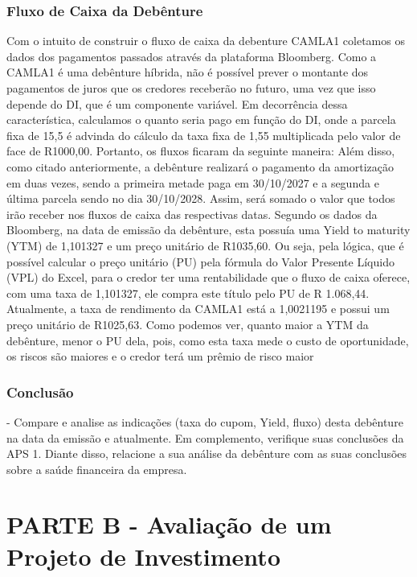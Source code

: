 \documentclass[11pt]{article}
\begin{document}
\subsubsection{\textbf{Fluxo de Caixa da Debênture }}
Com o intuito de construir o fluxo de caixa da debenture CAMLA1 coletamos os dados dos pagamentos passados através da plataforma Bloomberg. 
Como a CAMLA1 é uma debênture híbrida, não é possível prever o montante dos pagamentos de juros que os credores receberão no futuro, uma vez que isso depende do DI, que é um componente variável. Em decorrência dessa característica, calculamos o quanto seria pago em função do DI, onde a parcela fixa  de 15,5 é advinda do cálculo da taxa fixa de 1,55 multiplicada pelo valor de face de R1000,00. Portanto, os fluxos ficaram da seguinte maneira:
Além disso, como citado anteriormente, a debênture realizará o pagamento da amortização em duas vezes, sendo a primeira metade paga em 30/10/2027 e a segunda e última parcela sendo no dia 30/10/2028. Assim, será somado o valor que todos irão receber nos fluxos de caixa das respectivas datas. 
Segundo os dados da Bloomberg, na data de emissão da debênture, esta possuía uma Yield to maturity (YTM) de 1,101327 e um preço unitário de R1035,60. Ou seja, pela lógica, que é possível calcular o preço unitário (PU) pela fórmula do Valor Presente Líquido (VPL) do Excel, para o credor ter uma rentabilidade que o fluxo de caixa oferece, com uma taxa de 1,101327, ele compra este título pelo PU de R 1.068,44. 
Atualmente, a taxa de rendimento da CAMLA1 está a 1,0021195 e possui um preço unitário de R1025,63. Como podemos ver, quanto maior a YTM da debênture, menor o PU dela, pois, como esta taxa mede o custo de oportunidade, os riscos são maiores e o credor terá um prêmio de risco maior

\subsubsection{\textbf{}}
\subsubsection{\textbf{Conclusão}}
-	Compare e analise as indicações (taxa do cupom, Yield, fluxo) desta debênture na data da emissão e atualmente. Em complemento, verifique suas conclusões da APS 1. Diante disso, relacione a sua análise da debênture com as suas conclusões sobre a saúde financeira da empresa.

\section{\textbf{PARTE B - Avaliação de um Projeto de Investimento}}
\end{document}
